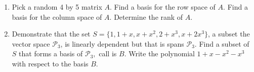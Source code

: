 \documentclass[11pt,fleqn]{article}
\begin{document}
\begin{enumerate}
\item Pick a random 4 by 5 matrix $A$. Find a basis for the row space of $A$. Find a basis for the column space of $A.$ Determine the rank of $A.$

\item Demonstrate that the set $S=\{1, 1+x, x+x^2, 2+x^3, x+2x^3\}$, a subset the vector space $\mathcal{P}_3$, is linearly dependent but that is spans $\mathcal{P}_3$. Find a subset of $S$ that forms a basis of $\mathcal{P}_3,$ call is $B.$ Write the polynomial $1+x-x^2-x^3$ with respect to the basis $B.$

\end{enumerate}
\end{document}
